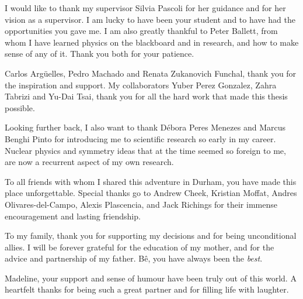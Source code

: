 \documentclass[openany,twoside,frontopenright,chaprunninghead]{ip3thesis}
\begin{document}
\begin{acknowledgements*}

	I would like to thank my supervisor Silvia Pascoli for her guidance and for her vision as a supervisor. I am lucky to have been your student and to have had the opportunities you gave me. I am also greatly thankful to Peter Ballett, from whom I have learned physics on the blackboard and in research, and how to make sense of any of it. Thank you both for your patience.
	
	\vspace{2ex}
	Carlos Arg\"uelles, Pedro Machado and Renata Zukanovich Funchal, thank you for the inspiration and support. My collaborators Yuber Perez Gonzalez, Zahra Tabrizi and Yu-Dai Tsai, thank you for all the hard work that made this thesis possible.
	
	\vspace{2ex}
	Looking further back, I also want to thank D\'ebora Peres Menezes and Marcus Benghi Pinto for introducing me to scientific research so early in my career. Nuclear physics and symmetry ideas that at the time seemed so foreign to me, are now a recurrent aspect of my own research.
	
	\vspace{2ex}	
	To all friends with whom I shared this adventure in Durham, you have made this place unforgettable. Special thanks go to Andrew Cheek, Kristian Moffat, Andres Olivares-del-Campo, Alexis Plascencia, and Jack Richings for their immense encouragement and lasting friendship.

	\vspace{2ex}
	To my family, thank you for supporting my decisions and for being unconditional allies. I will be forever grateful for the education of my mother, and for the advice and partnership of my father. B\^e, you have always been the \emph{best}.
	
	\vspace{2ex}
	Madeline, your support and sense of humour have been truly out of this world. A heartfelt thanks for being such a great partner and for filling life with laughter.
	
\end{acknowledgements*}



\cleardoublepage
\end{document}
